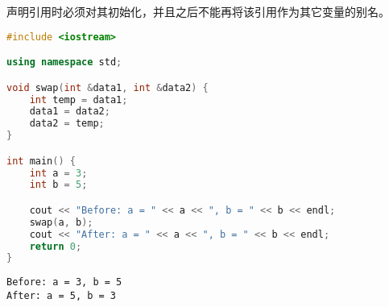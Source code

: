 声明引用时必须对其初始化，并且之后不能再将该引用作为其它变量的别名。\\


\begin{lstlisting}[language=C++]
#include <iostream>

using namespace std;

void swap(int &data1, int &data2) {
    int temp = data1;
    data1 = data2;
    data2 = temp;
}

int main() {
    int a = 3;
    int b = 5;

    cout << "Before: a = " << a << ", b = " << b << endl;
    swap(a, b);
    cout << "After: a = " << a << ", b = " << b << endl;
    return 0;
}
\end{lstlisting}

\begin{tcolorbox}
    \begin{verbatim}
Before: a = 3, b = 5
After: a = 5, b = 3
	\end{verbatim}
\end{tcolorbox}

\vspace{0.5cm}

\begin{table}[H]
    \centering
    \caption{指针与引用的区别}
\end{table}

